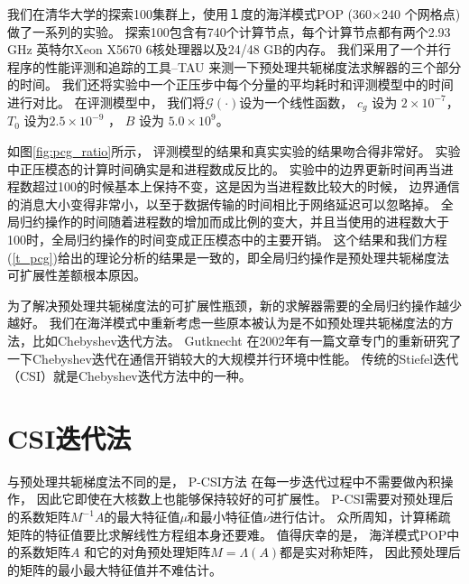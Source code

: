  
我们在清华大学的探索100集群上，使用１度的海洋模式POP (360$\times$240 个网格点)做了一系列的实验。 
探索100包含有740个计算节点，每个计算节点都有两个2.93 GHz 英特尔Xeon X5670 6核处理器以及24/48 GB的内存。 
我们采用了一个并行程序的性能评测和追踪的工具--TAU\cite{shende2006tau} 来测一下预处理共轭梯度法求解器的三个部分的时间。 
我们还将实验中一个正压步中每个分量的平均耗时和评测模型中的时间进行对比。 
在评测模型中， 我们将$\mathcal{G}(\cdot)$设为一个线性函数， $c_g$  设为 $2\times 10^{-7}$， $T_0$ 设为$2.5\times 10^{-9}$ ，  $B$  设为 $5.0\times 10^{9}$。 


如图\ref{fig:pcg_ratio}所示， 评测模型的结果和真实实验的结果吻合得非常好。 
实验中正压模态的计算时间确实是和进程数成反比的。 
实验中的边界更新时间再当进程数超过100的时候基本上保持不变，这是因为当进程数比较大的时候， 边界通信的消息大小变得非常小，以至于数据传输的时间相比于网络延迟可以忽略掉。 
全局归约操作的时间随着进程数的增加而成比例的变大，并且当使用的进程数大于100时，全局归约操作的时间变成正压模态中的主要开销。 
这个结果和我们方程(\ref{t_pcg})给出的理论分析的结果是一致的，即全局归约操作是预处理共轭梯度法可扩展性差额根本原因。 

为了解决预处理共轭梯度法的可扩展性瓶颈，新的求解器需要的全局归约操作越少越好。 
我们在海洋模式中重新考虑一些原本被认为是不如预处理共轭梯度法的方法，比如Chebyshev迭代方法。 
Gutknecht \cite{gutknecht2002chebyshev} 在2002年有一篇文章专门的重新研究了一下Chebyshev迭代在通信开销较大的大规模并行环境中性能。 
传统的Stiefel迭代（CSI）就是Chebyshev迭代方法中的一种。 


 
\section{CSI迭代法}
\label{sec:barocsi}
与预处理共轭梯度法不同的是， P-CSI方法 在每一步迭代过程中不需要做內积操作， 因此它即使在大核数上也能够保持较好的可扩展性。
P-CSI需要对预处理后的系数矩阵$M^{-1}A$的最大特征值$\mu$和最小特征值$\nu$进行估计。 
众所周知，计算稀疏矩阵的特征值要比求解线性方程组本身还要难。 
值得庆幸的是， 
海洋模式POP中的系数矩阵$A$ 和它的对角预处理矩阵$M = \Lambda(A)$都是实对称矩阵， 因此预处理后的矩阵的最小最大特征值并不难估计。 
 
